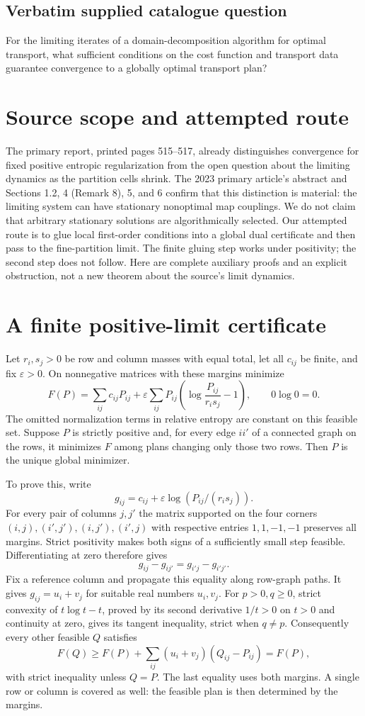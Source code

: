 \documentclass[11pt]{article}
\begin{document}
\subsection{Verbatim supplied catalogue question}
For the limiting iterates of a domain-decomposition algorithm for optimal transport, what sufficient conditions on the cost function and transport data guarantee convergence to a globally optimal transport plan?

\section{Source scope and attempted route}
The primary report, printed pages 515--517, already distinguishes
convergence for fixed positive entropic regularization from the open
question about the limiting dynamics as the partition cells shrink.
The 2023 primary article's abstract and Sections 1.2, 4 (Remark 8),
5, and 6 confirm that this distinction is material: the limiting
system can have stationary nonoptimal map couplings. We do not
claim that arbitrary stationary solutions are algorithmically selected.
Our attempted route is to glue local first-order conditions into a
global dual certificate and then pass to the fine-partition limit.
The finite gluing step works under positivity; the second step does
not follow. Here are complete auxiliary proofs and an explicit
obstruction, not a new theorem about the source's limit dynamics.

\section{A finite positive-limit certificate}
Let $r_i,s_j>0$ be row and column masses with equal total, let all
$c_{ij}$ be finite, and fix $\varepsilon>0$. On nonnegative matrices
with these margins minimize
\[
 F(P)=\sum_{ij}c_{ij}P_{ij}
 +\varepsilon\sum_{ij}P_{ij}\left(\log\frac{P_{ij}}{r_i s_j}-1\right),
 \qquad 0\log0=0.
\]
The omitted normalization terms in relative entropy are constant on
this feasible set. Suppose $P$ is strictly positive and, for every
edge $ii'$ of a connected graph on the rows, it minimizes $F$ among
plans changing only those two rows. Then $P$ is the unique global
minimizer.

To prove this, write
\[
 g_{ij}=c_{ij}+\varepsilon\log(P_{ij}/(r_i s_j)).
\]
For every pair of columns $j,j'$ the matrix supported on the four
corners $(i,j),(i',j'),(i,j'),(i',j)$ with respective entries
$1,1,-1,-1$ preserves all margins. Strict positivity makes both
signs of a sufficiently small step feasible. Differentiating at
zero therefore gives
\[
 g_{ij}-g_{ij'}=g_{i'j}-g_{i'j'}.
\]
Fix a reference column and propagate this equality along row-graph
paths. It gives $g_{ij}=u_i+v_j$ for suitable real numbers $u_i,v_j$.
For $p>0,q\ge0$, strict convexity of $t\log t-t$, proved by its
second derivative $1/t>0$ on $t>0$ and continuity at zero, gives
its tangent inequality, strict when $q\ne p$. Consequently every
other feasible $Q$ satisfies
\[
 F(Q)\ge F(P)+\sum_{ij}(u_i+v_j)(Q_{ij}-P_{ij})=F(P),
\]
with strict inequality unless $Q=P$. The last equality uses both
margins. A single row or column is covered as well: the feasible
plan is then determined by the margins.
\end{document}
